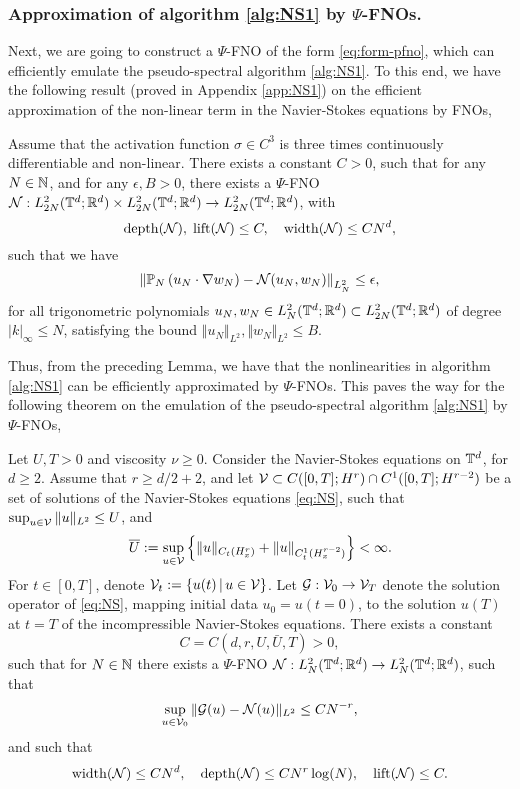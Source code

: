 \documentclass[reqno,a4paper]{amsart}
\begin{document}
\subsubsection{Approximation of algorithm \ref{alg:NS1} by $\Psi$-FNOs.}
Next, we are going to construct a $\Psi$-FNO of the form \eqref{eq:form-pfno}, which can efficiently emulate the pseudo-spectral algorithm \ref{alg:NS1}. To this end, we have the following result (proved in Appendix \ref{app:NS1}) on the efficient approximation of the non-linear term in the Navier-Stokes equations by FNOs,
\begin{lemma} \label{lem:fno-NSnonlin}
Assume that the activation function $\sigma\in C^3$ is three times continuously differentiable and non-linear. There exists a constant $C>0$, such that for any $N\in \mathbb{N}$, and for any $\epsilon, B > 0$, there exists a $\Psi$-FNO $\mathcal{N}: L^2_{2N}(\mathbb{T}^d;\mathbb{R}^d)\times L^2_{2N}(\mathbb{T}^d;\mathbb{R}^d) \to L^2_{2N}(\mathbb{T}^d;\mathbb{R}^d)$, with 
\[
\mathrm{depth}(\mathcal{N}), \; \mathrm{lift}(\mathcal{N}) \le C, 
\quad
\mathrm{width}(\mathcal{N}) \le C N^d,
\]
such that we have
\[
\left\Vert
\mathbb{P}_N\left(
u_N \cdot\nabla w_N
\right)
- 
\mathcal{N}(u_N, w_N)
\right\Vert_{L^2_N}
\le 
\epsilon,
\]
for all trigonometric polynomials $u_N, w_N\in L^2_N(\mathbb{T}^d; \mathbb{R}^d)\subset L^2_{2N}(\mathbb{T}^d; \mathbb{R}^d)$ of degree $|k|_\infty \le N$, satisfying the bound $\Vert u_N \Vert_{L^2}, \Vert w_N \Vert_{L^2} \le B$.
\end{lemma}
Thus, from the preceding Lemma, we have that the nonlinearities in algorithm \ref{alg:NS1} can be efficiently approximated by $\Psi$-FNOs. This paves the way for the following theorem on the emulation of the pseudo-spectral algorithm \ref{alg:NS1} by $\Psi$-FNOs,
\begin{theorem} \label{thm:fno-NS1}
Let $U,T>0$ and viscosity $\nu \ge 0$. Consider the Navier-Stokes equations on $\mathbb{T}^d$, for $d\ge 2$. Assume that $r\ge d/2 +2$, and let $\mathcal{V} \subset C([0,T]; H^r) \cap C^1([0,T];H^{r-2})$ be a set of solutions of the Navier-Stokes equations \eqref{eq:NS}, such that $\sup_{u\in \mathcal{V}} \Vert u \Vert_{L^2}\le U$, and 
\[
\overline{U}:= \sup_{u\in \mathcal{V}} \left\{
\Vert u \Vert_{C_t(H^r_x)} + \Vert u \Vert_{C^1_t(H^{r-2}_x)}
\right\}
< \infty.
\]
For $t\in [0,T]$, denote $\mathcal{V}_t := {\left\{ u(t) \,\middle|\, u\in \mathcal{V} \right\}}$. Let $\mathcal{G}: \mathcal{V}_0 \to \mathcal{V}_T$ denote the solution operator of \eqref{eq:NS}, mapping initial data $u_0 = u(t=0)$, to the solution $u(T)$ at $t=T$ of the incompressible Navier-Stokes equations. There exists a constant 
\[
C = C(d,r,U,\bar{U},T) > 0,
\]
such that for $N\in \mathbb{N}$ there exists a $\Psi$-FNO $\mathcal{N}: L^2_N(\mathbb{T}^d;\mathbb{R}^d) \to L^2_N(\mathbb{T}^d;\mathbb{R}^d)$, such that 
\[
\sup_{u\in \mathcal{V}_0}
\Vert \mathcal{G}(u) - \mathcal{N}(u) \Vert_{L^2}
\le
CN^{-r},
\]
and such that 
\[
\mathrm{width}(\mathcal{N}) \le C N^d, 
\quad
\mathrm{depth}(\mathcal{N}) \le C N^r \log(N),
\quad
\mathrm{lift}(\mathcal{N}) \le C.
\]
\end{theorem}
\end{document}
